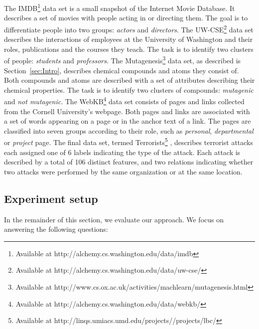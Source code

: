 The IMDB\footnote{Available at http://alchemy.cs.washington.edu/data/imdb} data set is a small snapshot of the Internet Movie Database.
It describes a set of movies with people acting in or directing them.
The goal is to differentiate people into two groups: \textit{actors} and \textit{directors}.
The UW-CSE\footnote{Available at http://alchemy.cs.washington.edu/data/uw-cse/} data set describes the interactions of employees at the University of Washington and their roles, publications and the courses they teach.
The task is to identify two clusters of people: \textit{students} and \textit{professors}.
The Mutagenesis\footnote{Available at http://www.cs.ox.ac.uk/activities/machlearn/mutagenesis.html} data set, as described is Section~\ref{sec:Intro}, describes chemical compounds and atoms they consist of. 
Both compounds and atoms are described with a set of attributes describing their chemical properties.
The task is to identify two clusters of compounds: \textit{mutagenic} and \textit{not mutagenic}.
The WebKB\footnote{Available at http://alchemy.cs.washington.edu/data/webkb/} data set consists of pages and links collected from the Cornell University's webpage.
Both pages and links are associated with a set of words appearing on a page or in the anchor text of a link.
The pages are classified into seven groups according to their role, such as \textit{personal}, \textit{departmental} or \textit{project} page.
The final data set, termed Terrorists\footnote{Available at http://linqs.umiacs.umd.edu/projects//projects/lbc/} \cite{sen:aimag08}, describes terrorist attacks each assigned one of 6 labels indicating the type of the attack.
Each attack is described by a total of 106 distinct features, and two relations indicating whether two attacks were performed by the same organization or at the same location.



\subsection{Experiment setup}

In the remainder of this section, we evaluate our approach.
We focus on answering the following questions:

